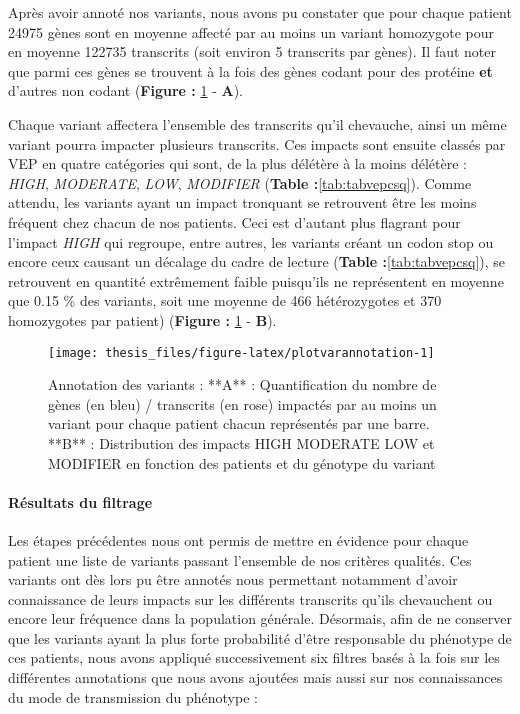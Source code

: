 \documentclass[12pt,twoside]{reedthesis}
\theoremstyle{definition}
\theoremstyle{definition}
\theoremstyle{remark}
\begin{document}
  Après avoir annoté nos variants, nous avons pu constater que pour chaque
  patient 24975 gènes sont en moyenne affecté par au moins un variant
  homozygote pour en moyenne 122735 transcrits (soit environ 5 transcrits
  par gènes). Il faut noter que parmi ces gènes se trouvent à la fois des
  gènes codant pour des protéine \textbf{et} d'autres non codant
  (\textbf{Figure : }\ref{fig:plotvarannotation} - \textbf{A}).
  
  Chaque variant affectera l'ensemble des transcrits qu'il chevauche,
  ainsi un même variant pourra impacter plusieurs transcrits. Ces impacts
  sont ensuite classés par VEP en quatre catégories qui sont, de la plus
  délétère à la moins délétère : \emph{HIGH}, \emph{MODERATE}, \emph{LOW},
  \emph{MODIFIER} (\textbf{Table :}\ref{tab:tabvepcsq}). Comme attendu,
  les variants ayant un impact tronquant se retrouvent être les moins
  fréquent chez chacun de nos patients. Ceci est d'autant plus flagrant
  pour l'impact \emph{HIGH} qui regroupe, entre autres, les variants
  créant un codon stop ou encore ceux causant un décalage du cadre de
  lecture (\textbf{Table :}\ref{tab:tabvepcsq}), se retrouvent en quantité
  extrêmement faible puisqu'ils ne représentent en moyenne que 0.15 \% des
  variants, soit une moyenne de 466 hétérozygotes et 370 homozygotes par
  patient) (\textbf{Figure : }\ref{fig:plotvarannotation} - \textbf{B}).
  
  \newpage
  
  \begin{figure}
  
  {\centering \texttt{[image: thesis\_files/figure-latex/plotvarannotation-1]} 
  
  }
  
  \caption[Annotation des variants]{Annotation des variants : **A** : Quantification du nombre de gènes (en bleu) / transcrits (en rose) impactés par au moins un variant pour chaque patient chacun représentés par une barre. **B** : Distribution des impacts HIGH MODERATE LOW et MODIFIER en fonction des patients et du génotype du variant}\label{fig:plotvarannotation}
  \end{figure}
  
  \newpage
  
  \hypertarget{filterdescription}{\paragraph{Résultats du
  filtrage}\label{filterdescription}}
  
  Les étapes précédentes nous ont permis de mettre en évidence pour chaque
  patient une liste de variants passant l'ensemble de nos critères
  qualités. Ces variants ont dès lors pu être annotés nous permettant
  notamment d'avoir connaissance de leurs impacts sur les différents
  transcrits qu'ils chevauchent ou encore leur fréquence dans la
  population générale. Désormais, afin de ne conserver que les variants
  ayant la plus forte probabilité d'être responsable du phénotype de ces
  patients, nous avons appliqué successivement six filtres basés à la fois
  sur les différentes annotations que nous avons ajoutées mais aussi sur
  nos connaissances du mode de transmission du phénotype :
  
\end{document}
